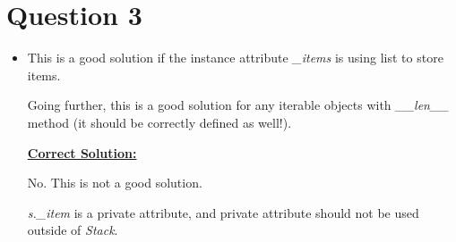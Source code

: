 \documentclass[12pt]{article}
\begin{document}
\section*{Question 3}
\begin{itemize}
    \item

    This is a good solution if the instance attribute \textit{\_items}
    is using list to store items.

    \bigskip

    Going further, this is a good solution for any iterable objects with
    \textit{\_\_len\_\_} method (it should be correctly defined as well!).


    \begin{mdframed}
        \underline{\textbf{Correct Solution:}}

        \bigskip
        \color{red}
        No. This is not a good solution.

        \bigskip

        \textit{s.\_item} is a private attribute, and private attribute should
        not be used outside of \textit{Stack}.

        \color{black}
    \end{mdframed}
\end{itemize}
\end{document}
